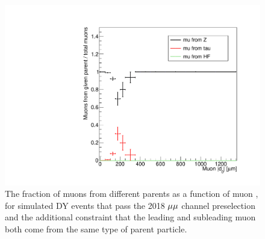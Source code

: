 \begin{figure}
\centering
\includegraphics[scale=0.35]{figures/bg/mumu_DY_muonAbsD0_1000um_variableBins_coarse_ratios.pdf}
\caption{The fraction of muons from different parents as a function of muon \ad, for simulated DY events that pass the 2018 ${\mu}{\mu}$ channel preselection and the additional constraint that the leading and subleading muon both come from the same type of parent particle.}
\label{dy_d0_behavior}
\end{figure}